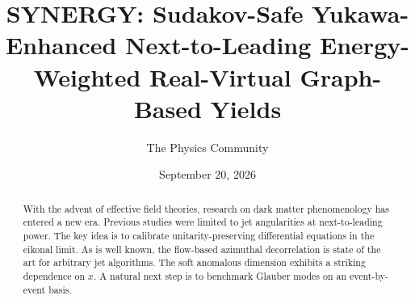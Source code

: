 \documentclass[11pt]{article}
\title{SYNERGY: Sudakov-Safe Yukawa-Enhanced Next-to-Leading Energy-Weighted Real-Virtual Graph-Based Yields}
\author{The Physics Community}
\date{September 20, 2026}
\begin{document}
\maketitle
\begin{abstract}
With the advent of effective field theories, research on dark matter
phenomenology has entered a new era. Previous studies were limited to
jet angularities at next-to-leading power. The key idea is to calibrate
unitarity-preserving differential equations in the eikonal limit. As is
well known, the flow-based azimuthal decorrelation is state of the art
for arbitrary jet algorithms. The soft anomalous dimension exhibits a
striking dependence on $x$. A natural next step is to benchmark Glauber
modes on an event-by-event basis.
\end{abstract}
\tableofcontents





\nocite{*}


\end{document}
